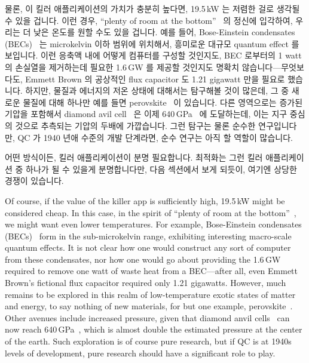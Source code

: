물론, 이 킬러 애플리케이션의 가치가 충분히 높다면, 19.5\,kW 는 저렴한 걸로
생각될 수 있을 겁니다.
이런 경우,
``plenty of room at the bottom''~\cite{RichardPFeynman1959RoomAtBottom} 의
정신에 입각하여, 우리는 더 낮은 온도를 원할 수도 있을 겁니다.
예를 들어, Bose-Einstein condensates
(BECs)~\cite{NIST2001BoseEinsteinCondensate} 는 microkelvin 이하 범위에
위치해서, 흥미로운 대규모 quantum effect 를 보입니다.
이런 응축액 내에 어떻게 컴퓨터를 구성할 것인지도, BEC 로부터의 1 watt 의
손실열을 제거하는데 필요한 1.6\,GW 를 제공할 것인지도 명확치
않습니다---무엇보다도, Emmett Brown 의 공상적인 flux capacitor 도 1.21 gigawatt
만을 필요로 했습니다.
하지만, 물질과 에너지의 저온 상태에 대해서는 탐구해볼 것이 많은데, 그 중 새로운
물질에 대해 하나만 예를 들면
perovskite~\cite{ZhengChen2016PerovskiteQDMOFthinFilm} 이 있습니다.
다른 영역으로는 증가된 기압을 포함해서 diamond avil
cell~\cite{Weir1959DiamondAnvilCell} 은 이제
640\,GPa~\cite{LeonidDubrovinsky2012640GPaDiamondAnvilCell} 에 도달하는데, 이는
지구 중심의 것으로 추측되는 기압의 두배에 가깝습니다.
그런 탐구는 물론 순수한 연구입니다만, QC 가 1940 년애 수준의 개발 단계라면,
순수 연구는 아직 할 역할이 많습니다.

어떤 방식이든, 킬러 애플리케이션이 분명 필요합니다.
최적화는 그런 킬러 애플리케이션 중 하나가 될 수 있을게 분명합니다만, 다음
섹션에서 보게 되듯이, 여기엔 상당한 경쟁이 있습니다.
\iffalse

Of course, if the value of the killer app is sufficiently high,
19.5\,kW might be considered cheap.
In this case, in the spirit of
``plenty of room at the bottom''~\cite{RichardPFeynman1959RoomAtBottom},
we might want even lower temperatures.
For example, Bose-Einstein condensates
(BECs)~\cite{NIST2001BoseEinsteinCondensate}
form in the sub-microkelvin range, exhibiting interesting
macro-scale quantum effects.
It is not clear how one would construct any sort of computer from
these condensates, nor how one would go about providing the 1.6\,GW
required to remove one watt of waste heat from a BEC---after all,
even Emmett Brown's fictional flux capacitor required only 1.21 gigawatts.
However, much remains to be explored in this realm
of low-temperature exotic states of matter and energy, to say
nothing of new materials, for but one example,
perovskite~\cite{ZhengChen2016PerovskiteQDMOFthinFilm}.
Other avenues include increased pressure, given that diamond anvil
cells~\cite{Weir1959DiamondAnvilCell} can now reach
640\,GPa~\cite{LeonidDubrovinsky2012640GPaDiamondAnvilCell},
which is almost double the estimated pressure at the center of the earth.
Such exploration is of course pure research, but if QC is at 1940s levels
of development, pure research should have a significant role to play.

